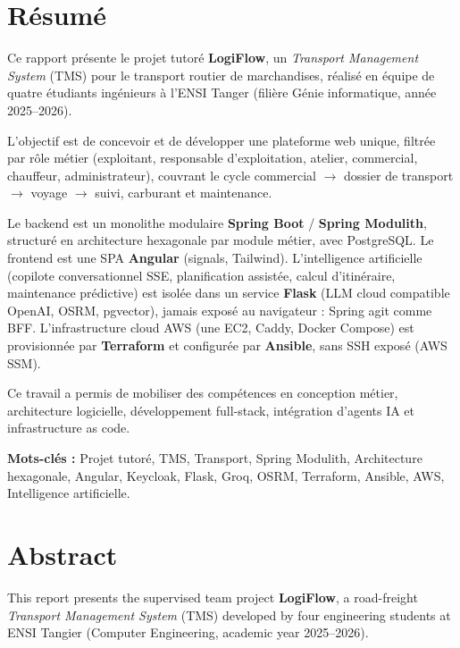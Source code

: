 \clearpage
\chapter*{Résumé}

Ce rapport présente le projet tutoré \textbf{LogiFlow}, un \emph{Transport Management System} (TMS) pour le transport routier de marchandises, réalisé en équipe de quatre étudiants ingénieurs à l'ENSI Tanger (filière Génie informatique, année 2025--2026).

L'objectif est de concevoir et de développer une plateforme web unique, filtrée par rôle métier (exploitant, responsable d'exploitation, atelier, commercial, chauffeur, administrateur), couvrant le cycle commercial $\rightarrow$ dossier de transport $\rightarrow$ voyage $\rightarrow$ suivi, carburant et maintenance.

Le backend est un monolithe modulaire \textbf{Spring Boot} / \textbf{Spring Modulith}, structuré en architecture hexagonale par module métier, avec PostgreSQL. Le frontend est une SPA \textbf{Angular} (signals, Tailwind). L'intelligence artificielle (copilote conversationnel SSE, planification assistée, calcul d'itinéraire, maintenance prédictive) est isolée dans un service \textbf{Flask} (LLM cloud compatible OpenAI, OSRM, pgvector), jamais exposé au navigateur : Spring agit comme BFF. L'infrastructure cloud AWS (une EC2, Caddy, Docker Compose) est provisionnée par \textbf{Terraform} et configurée par \textbf{Ansible}, sans SSH exposé (AWS SSM).

Ce travail a permis de mobiliser des compétences en conception métier, architecture logicielle, développement full-stack, intégration d'agents IA et infrastructure as code.

\vspace{1em}
\noindent\textbf{Mots-clés :} Projet tutoré, TMS, Transport, Spring Modulith, Architecture hexagonale, Angular, Keycloak, Flask, Groq, OSRM, Terraform, Ansible, AWS, Intelligence artificielle.

\clearpage
\chapter*{Abstract}

This report presents the supervised team project \textbf{LogiFlow}, a road-freight \emph{Transport Management System} (TMS) developed by four engineering students at ENSI Tangier (Computer Engineering, academic year 2025--2026).


